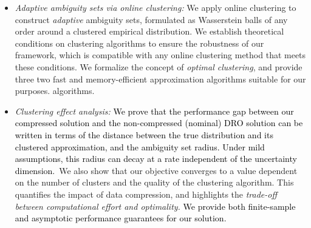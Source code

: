 \documentclass[12pt]{article}
\newcommand{\ie}{{\it i.e.}}
\newcommand{\RC}[1]{\textcolor{black}{#1}}
\newcommand{\RC}[1]{\textcolor{blue}{#1}}
\begin{document}
\begin{itemize}
    \item {\it Adaptive ambiguity sets via online clustering:} We apply online clustering to construct {\it adaptive} ambiguity sets, formulated as Wasserstein balls of any order around a clustered empirical distribution.
    We establish theoretical conditions on clustering algorithms to ensure the robustness of our framework, 
    \ifpreprint
    which is compatible with any online clustering method that meets these conditions. 
    We formalize the concept of {\it optimal clustering},
    \fi and provide \ifpreprint three \else two \fi fast and memory-efficient \ifpreprint approximation algorithms suitable for our purposes. 
    \else algorithms. \fi
    \item {\it Clustering effect analysis:}  
    \RC{We prove that the performance gap between our compressed solution and the non-compressed (nominal) \gls{DRO} solution can be written in terms of the distance between the true distribution and its clustered approximation, and the ambiguity set radius. Under mild assumptions, this radius can decay at a rate independent of the uncertainty dimension.}~We also show that our objective converges to a value dependent on the number of clusters and the quality of the clustering algorithm. 
    This quantifies the impact of data compression, and highlights the {\it trade-off between computational effort and optimality.}
    \RC{We provide both finite-sample and asymptotic performance guarantees for our solution.}

\end{itemize}
\end{document}
